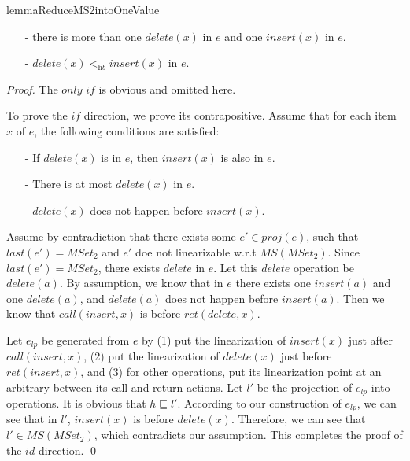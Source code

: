 {\begin{restatable}{lemma}{ReduceMS2intoOneValue}
\begin{itemize}
\item[-] there is more than one $\textit{delete}(x)$ in $e$ and one $\textit{insert}(x)$ in $e$.

\item[-] $\textit{delete}(x) <_{\textit{hb}} \textit{insert}(x)$ in $e$.
\end{itemize}
\end{restatable}

\begin {proof}

The $\textit{only if}$ is obvious and omitted here.

To prove the $\textit{if}$ direction, we prove its contrapositive. Assume that for each item $x$ of $e$, the following conditions are satisfied:

\begin{itemize}
\setlength{\itemsep}{0.5pt}
\item[-] If $\textit{delete}(x)$ is in $e$, then $\textit{insert}(x)$ is also in $e$.

\item[-] There is at most $\textit{delete}(x)$ in $e$.

\item[-] $\textit{delete}(x)$ does not happen before $\textit{insert}(x)$.
\end{itemize}

Assume by contradiction that there exists some $e' \in \textit{proj}(e)$, such that $\textit{last}(e') = \textit{MSet}_2$ and $e'$ doe not linearizable w.r.t $\textit{MS}(\textit{MSet}_2)$. Since $\textit{last}(e') = \textit{MSet}_2$, there exists $\textit{delete}$ in $e$. Let this $\textit{delete}$ operation be $\textit{delete}(a)$. By assumption, we know that in $e$ there exists one $\textit{insert}(a)$ and one $\textit{delete}(a)$, and $\textit{delete}(a)$ does not happen before $\textit{insert}(a)$. Then we know that $\textit{call}(\textit{insert},x)$ is before $\textit{ret}(\textit{delete},x)$.

Let $e_{\textit{lp}}$ be generated from $e$ by (1) put the linearization of $\textit{insert}(x)$ just after $\textit{call}(\textit{insert},x)$, (2) put the linearization of $\textit{delete}(x)$ just before $\textit{ret}(\textit{insert},x)$, and (3) for other operations, put its linearization point at an arbitrary between its call and return actions. Let $l'$ be the projection of $e_{\textit{lp}}$ into operations. It is obvious that $h \sqsubseteq l'$. According to our construction of $e_{\textit{lp}}$, we can see that in $l'$, $\textit{insert}(x)$ is before $\textit{delete}(x)$. Therefore, we can see that $l' \in \textit{MS}(\textit{MSet}_2)$, which contradicts our assumption. This completes the proof of the $\textit{id}$ direction. \qed
\end {proof}

}
